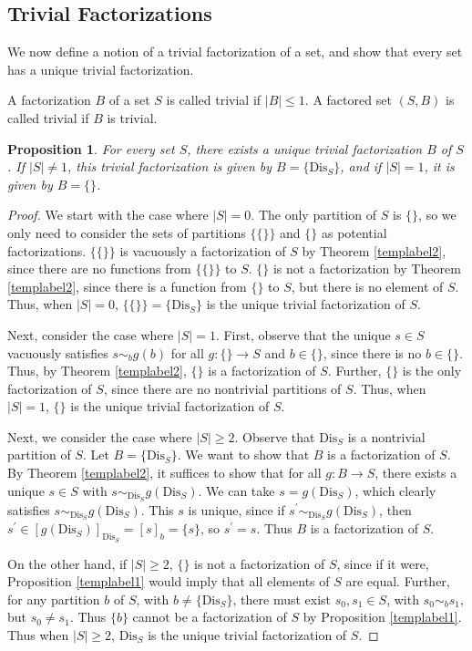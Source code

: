 \documentclass[authordate,onecolumn]{miri-tech-article}
\newtheorem{proposition}{Proposition}
\begin{document}
\subsection{Trivial Factorizations}
We now define a notion of a trivial factorization of a set, and show that every set has a unique trivial factorization.
\begin{definition}
A factorization $B$ of a set $S$ is called trivial if $|B|\leq 1$. A factored set $(S,B)$ is called trivial if $B$ is trivial.
\end{definition}
\begin{proposition}\label{templabel4}
For every set $S$, there exists a unique trivial factorization $B$ of $S$. If $|S|\neq 1$, this trivial factorization is given by $B=\{\text{Dis}_S\}$, and if $|S|=1$, it is given by $B=\{\}$.
\end{proposition}
\begin{proof}
We start with the case where $|S|=0$. The only partition of $S$ is $\{\}$, so we only need to consider the sets of partitions $\{\{\}\}$ and $\{\}$ as potential factorizations. $\{\{\}\}$ is vacuously a factorization of $S$ by Theorem \ref{templabel2}, since there are no functions from $\{\{\}\}$ to $S$. $\{\}$ is not a factorization by Theorem \ref{templabel2}, since there is a function from $\{\}$ to $S$, but there is no element of $S$. Thus, when $|S|=0$, $\{\{\}\}=\{\text{Dis}_S\}$ is the unique trivial factorization of $S$.

Next, consider the case where $|S|=1$. First, observe that the unique $s\in S$ vacuously satisfies $s\sim_b g(b)$ for all $g:\{\}\rightarrow S$ and $b\in \{\}$, since there is no $b\in \{\}$. Thus, by Theorem \ref{templabel2}, $\{\}$ is a factorization of $S$. Further, $\{\}$ is the only factorization of $S$, since there are no nontrivial partitions of $S$. Thus, when $|S|=1$, $\{\}$ is the unique trivial factorization of $S$.

Next, we consider the case where $|S|\geq 2$. Observe that $\text{Dis}_S$ is a nontrivial partition of $S$. Let $B=\{\text{Dis}_S\}$. We want to show that $B$ is a factorization of $S$. By Theorem \ref{templabel2}, it suffices to show that for all $g:B\rightarrow S$, there exists a unique $s\in S$ with $s\sim_{\text{Dis}_S} g(\text{Dis}_S)$. We can take $s=g(\text{Dis}_S)$, which clearly satisfies $s\sim_{\text{Dis}_S} g(\text{Dis}_S)$. This $s$ is unique, since if $s^\prime\sim_{\text{Dis}_S} g(\text{Dis}_S)$, then $s^\prime\in[g(\text{Dis}_S)]_{\text{Dis}_S}=[s]_b=\{s\}$, so $s^\prime = s$. Thus $B$ is a factorization of $S$.

On the other hand, if $|S|\geq 2$, $\{\}$ is not a factorization of $S$, since if it were, Proposition \ref{templabel1} would imply that all elements of $S$ are equal. Further, for any partition $b$ of $S$, with $b\neq \{\text{Dis}_S\}$, there must exist $s_0,s_1\in S$, with $s_0\sim_b s_1$, but $s_0\neq s_1$. Thus $\{b\}$ cannot be a factorization of $S$ by Proposition \ref{templabel1}. Thus when $|S|\geq 2$, $\text{Dis}_S$ is the unique trivial factorization of $S$.
\end{proof}
\end{document}
